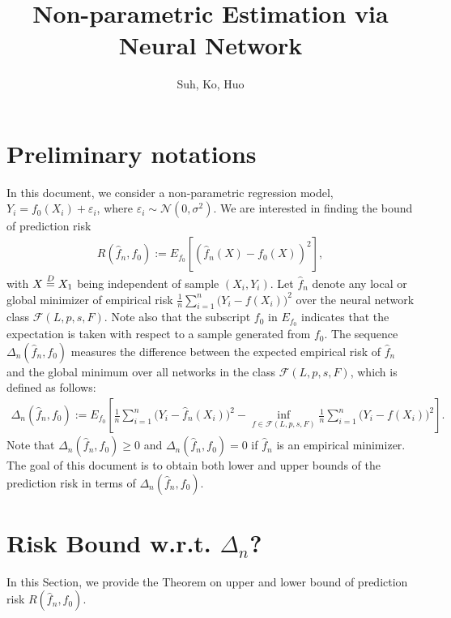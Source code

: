 \documentclass{article}
\title{Non-parametric Estimation via Neural Network}
\author{Suh, Ko, Huo}
\theoremstyle{definition}
\begin{document}
\maketitle

\section{Preliminary notations}
    In this document, we consider a non-parametric regression model, $Y_{i}=f_{0}(X_{i})+\varepsilon_{i}$, where $\varepsilon_{i}\sim \mathcal{N}(0,\sigma^{2})$.
    \noindent We are interested in finding the bound of prediction risk
    \begin{eqnarray}\nonumber
        R(\widehat{f}_{n},f_{0}):= E_{f_0}\left[\left(\widehat{f}_{n}(X)-f_{0}(X)\right)^{2}\right],
    \end{eqnarray}
    with $X\buildrel{D}\over=X_{1}$ being independent of sample $(X_{i},Y_{i})$.
    Let $\widehat{f}_{n}$ denote any local or global minimizer of empirical risk $\frac{1}{n}\sum_{i=1}^{n}\big(Y_{i}-f(X_{i})\big)^{2}$ over the neural network class $\mathcal{F}(L,p,s,F)$.
    Note also that the subscript $f_0$ in $E_{f_0}$ indicates that the expectation is taken with respect to a sample generated from $f_0$. 
    The sequence $\Delta_{n}(\widehat{f}_{n},f_{0})$ measures the difference between the expected empirical risk of $\widehat{f}_{n}$ and the global minimum over all networks in the class $\mathcal{F}(L,p,s,F)$, which is defined as follows:
    \begin{eqnarray}\nonumber
        \Delta_{n}(\widehat{f}_{n},f_0):=E_{f_{0}}\left[\frac{1}{n}\sum_{i=1}^{n}\big(Y_i-\widehat{f}_{n}(X_i)\big)^{2}-\inf_{f\in \mathcal{F}(L,p,s,F)}\frac{1}{n}\sum_{i=1}^{n}\big(Y_{i}-f(X_i)\big)^{2}\right].
    \end{eqnarray}
    Note that $\Delta_{n}(\widehat{f}_{n},f_0) \geq 0$ and $\Delta_{n}(\widehat{f}_{n},f_0)=0$ if $\widehat{f}_{n}$ is an empirical minimizer.
    The goal of this document is to obtain both lower and upper bounds of the prediction risk in terms of $\Delta_{n}(\widehat{f}_{n},f_{0})$.

\section{Risk Bound w.r.t. $\Delta_{n}$?}
In this Section, we provide the Theorem on upper and lower bound of prediction risk $R(\widehat{f}_{n},f_{0})$. 
\end{document}
